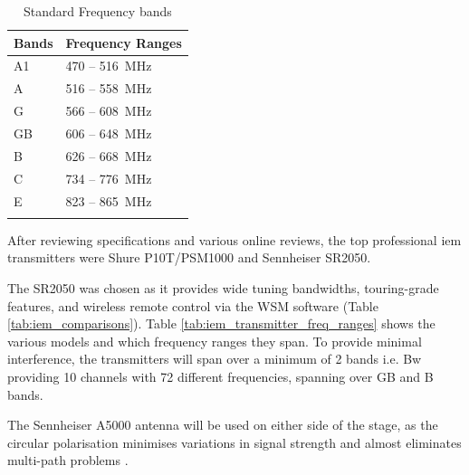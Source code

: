             \begin{longtable}[H]{|l|l|}
                \hline
                \textbf{Bands} & \textbf{Frequency   Ranges} \\ \hline
                \endfirsthead
                \endhead
                A1             & \SI{470}{} – \SI{516}{\MHz}               \\ \hline
                A              & \SI{516}{} – \SI{558}{\MHz}               \\ \hline
                G              & \SI{566}{} – \SI{608}{\MHz}               \\ \hline
                GB             & \SI{606}{} – \SI{648}{\MHz}               \\ \hline
                B              & \SI{626}{} – \SI{668}{\MHz}               \\ \hline
                C              & \SI{734}{} – \SI{776}{\MHz}               \\ \hline
                E              & \SI{823}{} – \SI{865}{\MHz}               \\ \hline
                \caption{Standard Frequency bands}
                \label{tab:frequency_band_licensing}
            \end{longtable}

            After reviewing specifications and various online reviews, the top professional \acrshort{iem} transmitters were Shure P10T/PSM1000 and Sennheiser SR2050.
            
            The SR2050 was chosen as it provides wide tuning bandwidths, touring-grade features, and wireless remote control via the WSM software (Table \ref{tab:iem_comparisons}). Table \ref{tab:iem_transmitter_freq_ranges} shows the various models and which frequency ranges they span. To provide minimal interference, the transmitters will span over a minimum of 2 bands i.e. Bw providing 10 channels with 72 different frequencies, spanning over GB and B bands.
            
            The Sennheiser A5000 antenna will be used on either side of the stage, as the circular polarisation minimises variations in signal strength and almost eliminates multi-path problems \citep{sennheiser-a5000}.

